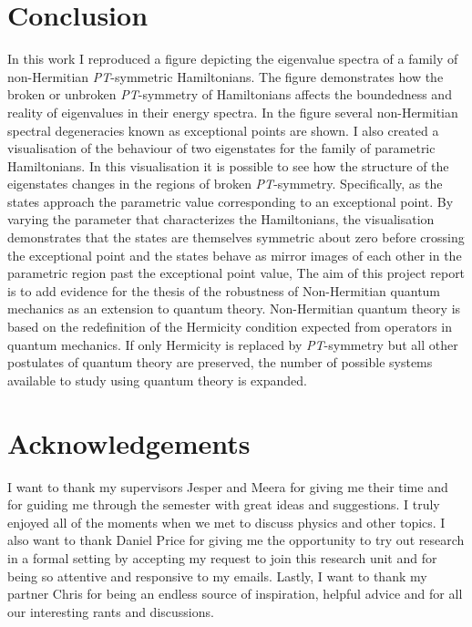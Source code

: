 \documentclass[10pt, a4paper, singlespacing]{report}
\newcommand\PT{\emph{PT}}
\begin{document}

\chapter{Conclusion}\label{Conclusion}
 In this work I reproduced a figure depicting the eigenvalue spectra of a family of non-Hermitian \PT-symmetric Hamiltonians. The figure demonstrates how the broken or unbroken \PT-symmetry of Hamiltonians affects the boundedness and reality of eigenvalues in their energy spectra. In the figure several non-Hermitian spectral degeneracies known as exceptional points are shown. I also created a visualisation of the behaviour of two eigenstates for the family of parametric Hamiltonians. In this visualisation it is possible to see how the structure of the eigenstates changes in the regions of broken \PT-symmetry. Specifically, as the states approach the parametric value corresponding to an exceptional point. By varying the parameter that characterizes the Hamiltonians, the visualisation demonstrates that the states are themselves symmetric about zero before crossing the exceptional point and the states behave as mirror images of each other in the parametric region past the exceptional point value, The aim of this project report is to add evidence for the thesis of the robustness of Non-Hermitian quantum mechanics as an extension to quantum theory. Non-Hermitian quantum theory is based on the redefinition of the Hermicity condition expected from operators in quantum mechanics. If only Hermicity is replaced by \PT-symmetry but all other postulates of quantum theory are preserved, the number of possible systems available to study using quantum theory is expanded.

\chapter{Acknowledgements}\label{Acknowledgements}
I want to thank my supervisors Jesper and Meera for giving me their time and for guiding me through the semester with great ideas and suggestions. I truly enjoyed all of the moments when we met to discuss physics and other topics. I also want to thank Daniel Price for giving me the opportunity to try out research in a formal setting by accepting my request to join this research unit and for being so attentive and responsive to my emails. Lastly, I want to thank my partner Chris for being an endless source of inspiration, helpful advice and for all our interesting rants and discussions. 
\end{document}

